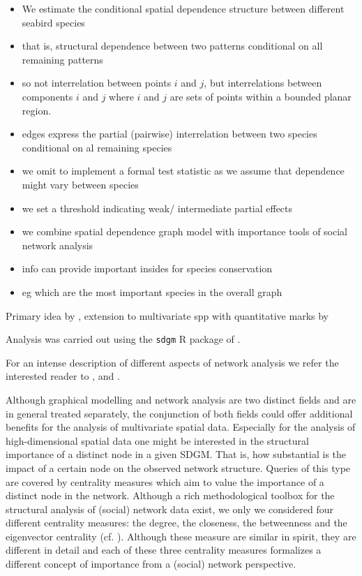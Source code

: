 \documentclass{statsoc}
\begin{document}
\begin{itemize}
\item We estimate the conditional spatial dependence structure between different seabird species
\item that is, structural dependence between two patterns conditional on all remaining patterns
\item so not interrelation between points $i$ and $j$, but interrelations between components $i$ and $j$ where $i$ and $j$ are sets of points within a bounded planar region.
\item edges express the partial (pairwise) interrelation between two species conditional on al remaining species
\item we omit to implement a formal test statistic as we assume that dependence might vary between species
\item we set a threshold indicating weak/ intermediate partial effects
\item we combine spatial dependence graph model with importance tools of social network analysis
\item info can provide important insides for species conservation
\item eg which are the most important species in the overall graph
\end{itemize}

Primary idea by \cite{Eckardt2016}, extension to multivariate spp with quantitative marks by \cite{Eckardt2016b}

Analysis was carried out using the \texttt{sdgm} R package of \cite{Eckardt2016a}.

For an intense description of different aspects of network analysis we refer the interested reader to \cite{Carrington2005}, \cite{Kolaczyk:2009} and \cite{Goldenberg:EtAl:2010}.


Although graphical modelling and network analysis are two distinct fields and are in general treated separately, the conjunction of both fields could offer additional benefits for the analysis of multivariate spatial data.  Especially for the analysis of high-dimensional spatial data one might be interested in the structural importance of a distinct node in a given SDGM. That is, how substantial is the impact of a certain node on the observed network structure. Queries of this type are covered by centrality measures which aim to value the importance of a distinct  node in the network. Although a rich methodological toolbox for the structural analysis of (social) network data exist, we only  we considered four different centrality measures: the degree, the closeness, the betweenness and the eigenvector centrality (cf. \cite{Borgatti2006, Freeman1979, Newman2004}). Although these measure are similar in spirit, they are different in detail and each of these three centrality measures formalizes a different concept of importance from a (social) network  perspective.
\end{document}

